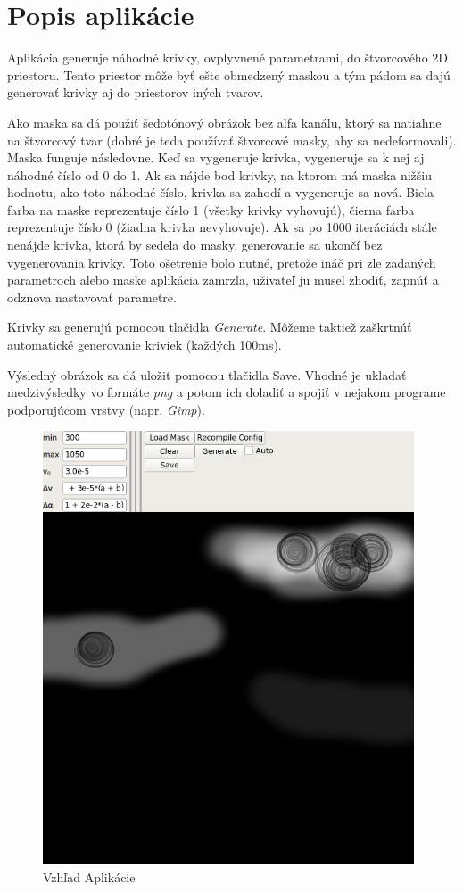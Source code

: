 \documentclass[11pt,a4paper]{article}
\begin{document}
\titlepageandcontents

\section{Popis aplikácie}

Aplikácia generuje náhodné krivky, ovplyvnené parametrami, do štvorcového 2D
priestoru. Tento priestor môže byť ešte obmedzený maskou a tým pádom sa dajú
generovať krivky aj do priestorov iných tvarov.

Ako maska sa dá použiť šedotónový obrázok bez alfa kanálu, ktorý sa natiahne na
štvorcový tvar (dobré je teda používať štvorcové masky, aby sa nedeformovali).
Maska funguje následovne. Keď sa vygeneruje krivka, vygeneruje sa k nej aj
náhodné číslo od 0 do 1. Ak sa nájde bod krivky, na ktorom má maska nižšiu
hodnotu, ako toto náhodné číslo, krivka sa zahodí a vygeneruje sa nová. Biela
farba na maske reprezentuje číslo 1 (všetky krivky vyhovujú), čierna farba
reprezentuje číslo 0 (žiadna krivka nevyhovuje). Ak sa po 1000 iteráciách stále
nenájde krivka, ktorá by sedela do masky, generovanie sa ukončí bez
vygenerovania krivky. Toto ošetrenie bolo nutné, pretože ináč pri zle zadaných
parametroch alebo maske aplikácia zamrzla, uživateľ ju musel zhodiť, zapnúť a
odznova nastavovať parametre.

Krivky sa generujú pomocou tlačidla \emph{Generate}. Môžeme taktiež zaškrtnúť
automatické generovanie kriviek (každých 100ms).

Výsledný obrázok sa dá uložiť pomocou tlačidla Save. Vhodné je ukladať
medzivýsledky vo formáte \emph{png} a potom ich doladiť a spojiť v nejakom
programe podporujúcom vrstvy (napr. \emph{Gimp}).

\FloatBarrier

\begin{figure}[!h]
  \centering
  \includegraphics[width=11cm]{images/app.png}
  \caption{Vzhľad Aplikácie}
\end{figure}
\end{document}

